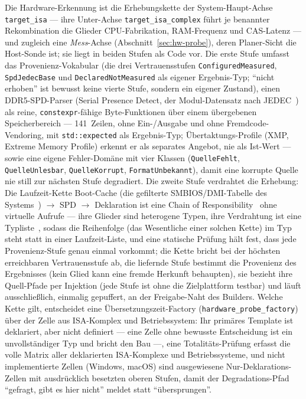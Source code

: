 \begin{nurlang}
Die Hardware-Erkennung ist die Erhebungskette der System-Haupt-Achse \texttt{target\_isa} --- ihre
Unter-Achse \texttt{target\_isa\_complex} führt je benannter Rekombination die Glieder CPU-Fabrikation,
RAM-Frequenz und CAS-Latenz --- und zugleich eine \emph{Mess}-Achse (Abschnitt~\ref{sec:hw-probe}), deren
Planer-Sicht die Host-Sonde ist; sie liegt in beiden Stufen als Code vor. Die erste Stufe umfasst
das Provenienz-Vokabular (die drei Vertrauensstufen \texttt{ConfiguredMeasured}, \texttt{SpdJedecBase}
und \texttt{DeclaredNotMeasured} als eigener Ergebnis-Typ; \enquote{nicht erhoben} ist bewusst keine
vierte Stufe, sondern ein eigener Zustand), einen DDR5-SPD-Parser (Serial Presence Detect, der
Modul-Datensatz nach JEDEC~\cite{jedec_jesd400_5}) als reine, \texttt{constexpr}-fähige Byte-Funktionen
über einem übergebenen Speicherbereich --- 141~Zeilen, ohne Ein-/Ausgabe und ohne Fremdcode-Vendoring,
mit \texttt{std::expected} als Ergebnis-Typ; Übertaktungs-Profile (XMP, Extreme Memory Profile) erkennt
er als separates Angebot, nie als Ist-Wert --- sowie eine eigene Fehler-Domäne mit vier Klassen
(\texttt{QuelleFehlt}, \texttt{QuelleUnlesbar}, \texttt{QuelleKorrupt}, \texttt{FormatUnbekannt}), damit
eine korrupte Quelle nie still zur nächsten Stufe degradiert. Die zweite Stufe verdrahtet die Erhebung:
Die Laufzeit-Kette Boot-Cache (die gefilterte SMBIOS/DMI-Tabelle des Systems~\cite{dmtf_smbios}) $\to$
SPD $\to$ Deklaration ist eine Chain of Responsibility~\cite{gamma1994patterns} ohne virtuelle Aufrufe
--- ihre Glieder sind heterogene Typen, ihre Verdrahtung ist eine Typliste~\cite{alexandrescu2001modern},
sodass die Reihenfolge (das Wesentliche einer solchen Kette) im Typ steht statt in einer Laufzeit-Liste,
und eine statische Prüfung hält fest, dass jede Provenienz-Stufe genau einmal vorkommt; die Kette bricht bei der
höchsten erreichbaren Vertrauensstufe ab, die liefernde Stufe bestimmt die Provenienz des Ergebnisses
(kein Glied kann eine fremde Herkunft behaupten), sie bezieht ihre Quell-Pfade per Injektion (jede Stufe
ist ohne die Zielplattform testbar) und läuft ausschließlich, einmalig gepuffert, an der Freigabe-Naht
des Builders. Welche Kette gilt, entscheidet eine Übersetzungszeit-Factory
(\texttt{hardware\_probe\_factory}) über der Zelle aus ISA-Komplex und Betriebssystem: Ihr primäres
Template ist deklariert, aber nicht definiert --- eine Zelle ohne bewusste Entscheidung ist ein
unvollständiger Typ und bricht den Bau ---, eine Totalitäts-Prüfung erfasst die volle Matrix aller
deklarierten ISA-Komplexe und Betriebssysteme, und nicht implementierte Zellen (Windows, macOS) sind
ausgewiesene Nur-Deklarations-Zellen mit ausdrücklich besetzten oberen Stufen, damit der Degradations-Pfad
\enquote{gefragt, gibt es hier nicht} meldet statt \enquote{übersprungen}.
\end{nurlang}

